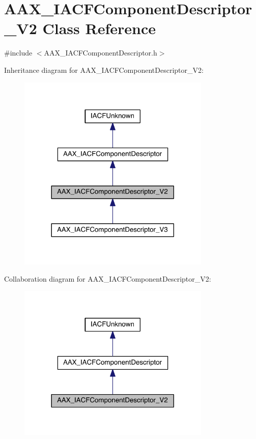 \hypertarget{a00051}{}\section{A\+A\+X\+\_\+\+I\+A\+C\+F\+Component\+Descriptor\+\_\+\+V2 Class Reference}
\label{a00051}


{\ttfamily \#include $<$A\+A\+X\+\_\+\+I\+A\+C\+F\+Component\+Descriptor.\+h$>$}



Inheritance diagram for A\+A\+X\+\_\+\+I\+A\+C\+F\+Component\+Descriptor\+\_\+\+V2\+:
\nopagebreak
\begin{figure}[H]
\begin{center}
\leavevmode
\includegraphics[width=260pt]{a00496}
\end{center}
\end{figure}


Collaboration diagram for A\+A\+X\+\_\+\+I\+A\+C\+F\+Component\+Descriptor\+\_\+\+V2\+:
\nopagebreak
\begin{figure}[H]
\begin{center}
\leavevmode
\includegraphics[width=260pt]{a00497}
\end{center}
\end{figure}


